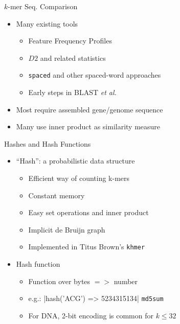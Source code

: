 \documentclass[t]{beamer}
\begin{document}
\begin{frame}{$k$-mer Seq. Comparison}
  \begin{itemize}
    \item Many existing tools
    \begin{itemize}
      \item Feature Frequency Profiles \autocite{sims_alignment-free_2009}
      \item $D2$ and related statistics
      \item \texttt{spaced} and other spaced-word approaches
        \autocite{morgenstern_estimating_2015,leimeister_fast_2014}
      \item Early steps in BLAST \textit{et al.}
    \end{itemize}
    \item Most require assembled gene/genome sequence
    \item Many use inner product as similarity measure
  \end{itemize}
\end{frame}


\begin{frame}{Hashes and Hash Functions}
  \begin{itemize}
    \item ``Hash'': a probabilistic data structure
      \begin{itemize}
        \item Efficient way of counting k-mers
        \item Constant memory
        \item Easy set operations and inner product
        \item Implicit de Bruijn graph
        \item Implemented in Titus Brown's \texttt{khmer}
      \end{itemize}
    \item Hash function
      \begin{itemize}
        \item Function over bytes $=>$ number
        \item e.g.: |hash('ACG') => 5234315134| \texttt{md5sum}
        \item For DNA, 2-bit encoding is common for $k \le  32$
      \end{itemize}
  \end{itemize}
\end{frame}
\end{document}
